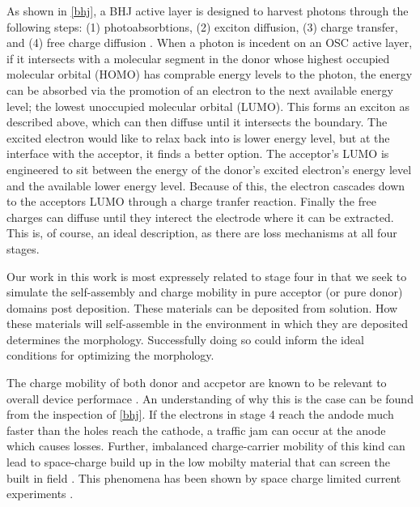 As shown in \ref{bhj}, a BHJ active layer is designed to harvest photons through the following 
steps: (1) photoabsorbtions, 
(2) exciton diffusion, (3) charge transfer, and (4) free charge diffusion \cite{Fusella2019}. 
When a photon is incedent on
an OSC active layer, if it intersects with a molecular segment in the donor whose 
highest occupied molecular orbital (HOMO) has comprable energy levels to the photon, 
the energy can be absorbed via the promotion of
an electron to the next available energy level; the lowest unoccupied molecular orbital (LUMO).
This forms an exciton as
described above, which can then diffuse until it intersects the boundary. 
The excited electron would like to relax
back into is lower energy level, but at the interface with the acceptor, it finds a better option. The
acceptor's LUMO is engineered to sit between the energy of the donor's excited electron's energy level and the
available lower energy level. Because of this, the electron cascades down to the acceptors LUMO through a charge
tranfer reaction. Finally the free charges can diffuse until they interect the electrode where it can be
extracted. This is, of course, an ideal description, as there are loss mechanisms at all four stages. 

Our work in this work
is most expressely related to stage four in that we seek to simulate the self-assembly and
charge mobility in pure acceptor (or
pure donor) domains post deposition. 
These materials can be deposited from solution.
How these materials will self-assemble in the environment in which they are deposited determines
the morphology.  
Successfully doing so could inform the ideal conditions for optimizing the morphology.

The charge mobility of both donor and accpetor
are known to be relevant to overall device performace \cite{Wang2019e}.
An understanding of why this is the case can be found from the inspection of \autoref{bhj}.
If the electrons in stage 4 reach the andode much faster than the holes reach the cathode, a traffic jam can
occur at the anode which causes losses. 
Further, imbalanced charge-carrier mobility of this kind can lead to space-charge build up in the 
low mobilty material that can screen the built in field \cite{Bartelt2015}.
This phenomena has been shown by space charge limited current experiments \cite{Small2013}.

